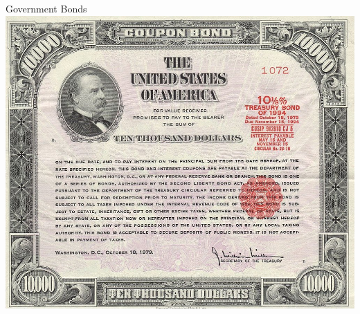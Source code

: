 \documentclass{beamer}
\begin{document}

\begin{frame}{\LARGE Government Bonds}
    \centering
\includegraphics[width=\textwidth,height=0.8\textheight,keepaspectratio]{1979-10000-Treasury-Bond.jpg}
\end{frame}
\end{document}
